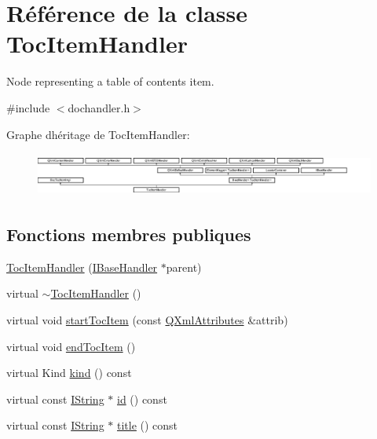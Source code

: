 \hypertarget{class_toc_item_handler}{}\section{Référence de la classe Toc\+Item\+Handler}
\label{class_toc_item_handler}


Node representing a table of contents item.  




{\ttfamily \#include $<$dochandler.\+h$>$}

Graphe d\textquotesingle{}héritage de Toc\+Item\+Handler\+:\begin{figure}[H]
\begin{center}
\leavevmode
\includegraphics[height=1.454545cm]{class_toc_item_handler}
\end{center}
\end{figure}
\subsection*{Fonctions membres publiques}
\begin{DoxyCompactItemize}
\item 
\hyperlink{class_toc_item_handler_acfd87c9d47c15a5d86ad43df421775af}{Toc\+Item\+Handler} (\hyperlink{class_i_base_handler}{I\+Base\+Handler} $\ast$parent)
\item 
virtual \hyperlink{class_toc_item_handler_a252f3d33c9d5e7d217850af5d6ed4bf1}{$\sim$\+Toc\+Item\+Handler} ()
\item 
virtual void \hyperlink{class_toc_item_handler_a4e38e3bfa24aa30c2f72d98c37f93002}{start\+Toc\+Item} (const \hyperlink{class_q_xml_attributes}{Q\+Xml\+Attributes} \&attrib)
\item 
virtual void \hyperlink{class_toc_item_handler_abfe391c3318fe4338ee374fbb15a3a89}{end\+Toc\+Item} ()
\item 
virtual Kind \hyperlink{class_toc_item_handler_af5ad68083e0d625bfc91d2f0ed8555b4}{kind} () const 
\item 
virtual const \hyperlink{class_i_string}{I\+String} $\ast$ \hyperlink{class_toc_item_handler_a2a1ac241ae0e030d916cba8119ed3167}{id} () const 
\item 
virtual const \hyperlink{class_i_string}{I\+String} $\ast$ \hyperlink{class_toc_item_handler_a68c4f3389f34ef631405781b1d4ea6b9}{title} () const 
\end{DoxyCompactItemize}
